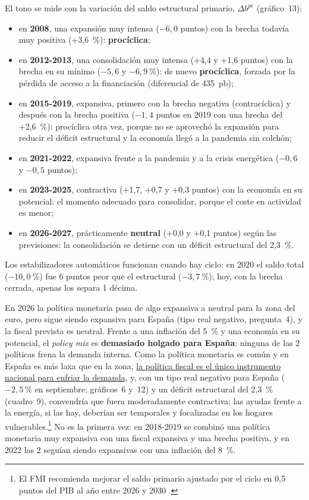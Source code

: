 \begin{examen}
El tono se mide con la variación del saldo estructural primario, $\Delta b^{pe}$ (gráfico~13):
\begin{itemize}
\item en \textbf{2008}, una expansión muy intensa ($-6{,}0$ puntos) con la brecha todavía muy positiva (+3,6~\%): \textbf{procíclica};
\item en \textbf{2012-2013}, una consolidación muy intensa (+4,4 y +1,6 puntos) con la brecha en su mínimo ($-5{,}6$ y $-6{,}9~\%$): de nuevo \textbf{procíclica}, forzada por la pérdida de acceso a la financiación (diferencial de 435~pb);
\item en \textbf{2015-2019}, expansiva, primero con la brecha negativa (contracíclica) y después con la brecha positiva ($-1{,}4$ puntos en 2019 con una brecha del +2,6~\%): procíclica otra vez, porque no se aprovechó la expansión para reducir el déficit estructural y la economía llegó a la pandemia sin colchón;
\item en \textbf{2021-2022}, expansiva frente a la pandemia y a la crisis energética ($-0{,}6$ y $-0{,}5$ puntos);
\item en \textbf{2023-2025}, contractiva (+1,7, +0,7 y +0,3 puntos) con la economía en su potencial: el momento adecuado para consolidar, porque el coste en actividad es menor;
\item en \textbf{2026-2027}, prácticamente \textbf{neutral} (+0,0 y +0,1 puntos) según las previsiones: la consolidación se detiene con un déficit estructural del 2,3~\%.
\end{itemize}
Los estabilizadores automáticos funcionan cuando hay ciclo: en 2020 el saldo total ($-10{,}0~\%$) fue 6 puntos peor que el estructural ($-3{,}7~\%$); hoy, con la brecha cerrada, apenas los separa 1 décima.

En 2026 la política monetaria pasa de algo expansiva a neutral para la zona del euro, pero sigue siendo expansiva para España (tipo real negativo, pregunta~4), y la fiscal prevista es neutral. Frente a una inflación del 5~\% y una economía en su potencial, el \emph{policy mix} es \textbf{demasiado holgado para España}: ninguna de las 2 políticas frena la demanda interna. Como la política monetaria es común y en España es más laxa que en la zona, \uline{la política fiscal es el único instrumento nacional para enfriar la demanda}, y, con un tipo real negativo para España ($-2{,}5~\%$ en septiembre; gráficos~6 y~12) y un déficit estructural del 2,3~\% (cuadro~9), convendría que fuera moderadamente contractiva; las ayudas frente a la energía, si las hay, deberían ser temporales y focalizadas en los hogares vulnerables.\footnote{El FMI recomienda mejorar el saldo primario ajustado por el ciclo en 0,5 puntos del PIB al año entre 2026 y 2030 .} No es la primera vez: en 2018-2019 se combinó una política monetaria muy expansiva con una fiscal expansiva y una brecha positiva, y en 2022 las 2 seguían siendo expansivas con una inflación del 8~\%.


\end{examen}
